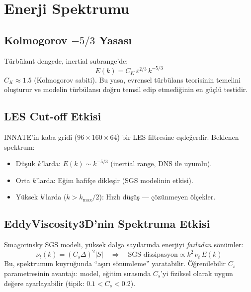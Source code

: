 \section{Enerji Spektrumu}
\label{sec:spektrum_beklenen}

\subsection{Kolmogorov $-5/3$ Yasası}

Türbülant dengede, inertial subrange'de:
\begin{equation}
    E(k) = C_K \, \varepsilon^{2/3} \, k^{-5/3}
    \label{eq:kolmogorov_spectrum}
\end{equation}
$C_K \approx 1.5$ (Kolmogorov sabiti). Bu yasa, evrensel türbülans teorisinin temelini oluşturur ve modelin türbülansı doğru temsil edip etmediğinin en güçlü testidir.

\subsection{LES Cut-off Etkisi}

INNATE'in kaba gridi ($96 \times 160 \times 64$) bir LES filtresine eşdeğerdir. Beklenen spektrum:
\begin{itemize}
    \item Düşük $k$'larda: $E(k) \sim k^{-5/3}$ (inertial range, DNS ile uyumlu).
    \item Orta $k$'larda: Eğim hafifçe dikleşir (SGS modelinin etkisi).
    \item Yüksek $k$'larda ($k > k_{\max}/2$): Hızlı düşüş --- çözünmeyen ölçekler.
\end{itemize}

\subsection{EddyViscosity3D'nin Spektruma Etkisi}

Smagorinsky SGS modeli, yüksek dalga sayılarında enerjiyi \textit{fazladan} sönümler:
\begin{equation}
    \nu_t(k) = (C_s \Delta)^2 |S| \quad \Longrightarrow \quad \text{SGS dissipasyon} \propto k^2 \, \nu_t \, E(k)
\end{equation}
Bu, spektrumun kuyruğunda ``aşırı sönümleme'' yaratabilir. Öğrenilebilir $C_s$ parametresinin avantajı: model, eğitim sırasında $C_s$'yi fiziksel olarak uygun değere ayarlayabilir (tipik: $0.1 < C_s < 0.2$).

